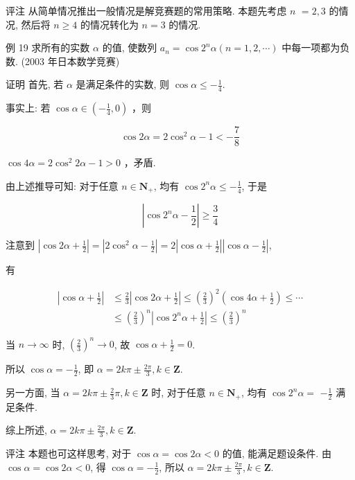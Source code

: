 	评注 从简单情况推出一般情况是解竞赛题的常用策略. 本题先考虑 $n$ $=2,3$ 的情况, 然后将 $n \geqslant 4$ 的情况转化为 $n=3$ 的情况.

	例 19 求所有的实数 $\alpha$ 的值, 使数列 $a_{n}=\cos 2^{n} \alpha(n=1,2, \cdots)$ 中每一项都为负数. (2003 年日本数学竞赛)

	证明 首先, 若 $\alpha$ 是满足条件的实数, 则 $\cos \alpha \leqslant-\frac{1}{4}$.

	事实上: 若 $\cos \alpha \in\left(-\frac{1}{4}, 0\right)$ ，则

	$$
		\cos 2 \alpha=2 \cos ^{2} \alpha-1<-\frac{7}{8}
	$$

$\cos 4 \alpha=2 \cos ^{2} 2 \alpha-1>0$ ，矛盾.

	由上述推导可知: 对于任意 $n \in \mathbf{N}_{+}$, 均有 $\cos 2^{n} \alpha \leqslant-\frac{1}{4}$, 于是

	$$
		\left|\cos 2^{n} \alpha-\frac{1}{2}\right| \geqslant \frac{3}{4}
	$$

	注意到 $\left|\cos 2 \alpha+\frac{1}{2}\right|=\left|2 \cos ^{2} \alpha-\frac{1}{2}\right|=2\left|\cos \alpha+\frac{1}{2}\right|\left|\cos \alpha-\frac{1}{2}\right|$,

	有

	$$
		\begin{aligned}
			\left|\cos \alpha+\frac{1}{2}\right| & \leqslant \frac{2}{3}\left|\cos 2 \alpha+\frac{1}{2}\right| \leqslant\left(\frac{2}{3}\right)^{2}\left(\cos 4 \alpha+\frac{1}{2}\right) \leqslant \cdots \\
			                                     & \leqslant\left(\frac{2}{3}\right)^{n}\left|\cos 2^{n} \alpha+\frac{1}{2}\right| \leqslant\left(\frac{2}{3}\right)^{n}
		\end{aligned}
	$$

	当 $n \rightarrow \infty$ 时, $\left(\frac{2}{3}\right)^{n} \rightarrow 0$, 故 $\cos \alpha+\frac{1}{2}=0$.

	所以 $\cos \alpha=-\frac{1}{2}$, 即 $\alpha=2 k \pi \pm \frac{2 \pi}{3}, k \in \mathbf{Z}$.

	另一方面, 当 $\alpha=2 k \pi \pm \frac{2}{3} \pi, k \in \mathbf{Z}$ 时, 对于任意 $n \in \mathbf{N}_{+}$, 均有 $\cos 2^{n} \alpha=$ $-\frac{1}{2}$ 满足条件.

	综上所述, $\alpha=2 k \pi \pm \frac{2 \pi}{3}, k \in \mathbf{Z}$.

	评注 本题也可这样思考, 对于 $\cos \alpha=\cos 2 \alpha<0$ 的值, 能满足题设条件. 由 $\cos \alpha=\cos 2 \alpha<0$, 得 $\cos \alpha=-\frac{1}{2}$, 所以 $\alpha=2 k \pi \pm \frac{2 \pi}{3}, k \in \mathbf{Z}$.

